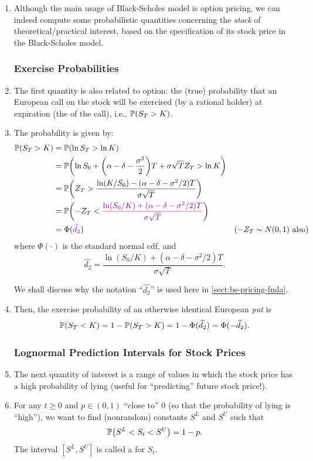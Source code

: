 \begin{enumerate}
\item Although the main usage of Black-Scholes model is option pricing, we can
indeed compute some probabilistic quantities concerning the \emph{stock}
 of theoretical/practical interest, based on the
specification of its stock price in the Black-Scholes model.
\subsubsection*{Exercise Probabilities}
\item The first quantity is also related to option: the (true) probability that
an European call on the stock  will be exercised (by a
rational holder) at expiration (the  of the call),
i.e.,
\(\mathbb{P}\qty(S_T>K)\).
\item \label{it:bs-exercise-prob-fmla}
The probability is given by:
\begin{align*}
\prob{S_T>K}&=\prob{\ln S_T>\ln K}\\
&=\prob{\ln S_0+\qty(\alpha-\delta-\frac{\sigma^2}{2})T+\sigma\sqrt{T}Z_T>\ln K}\\
&=\prob{Z_T>\frac{\ln(K/S_0)-(\alpha-\delta-\sigma^2/2)T}{\sigma\sqrt{T}}}\\
&=\prob{{\color{Maroon}-}Z_T<{\color{violet}\frac{\ln(S_0/K)+(\alpha-\delta-\sigma^2/2)T}{\sigma\sqrt{T}}}}\\
&=\Phi({\color{violet}\widehat{d_2}})&(-Z_T\sim N(0,1)\text{ also})
\end{align*}
where \(\Phi(\cdot)\) is the standard normal cdf, and 
\[
\text{\(\widehat{d_2}\)}=\frac{\ln(S_0/K)+(\alpha-\delta-\sigma^2/2)T}{\sigma\sqrt{T}}.
\]
\begin{note}
We shall discuss why the notation ``\(\widehat{d_2}\)'' is used here in
\cref{sect:bs-pricing-fmla}.
\end{note}
\item Then, the exercise probability of an otherwise identical European
\emph{put} is
\[
\mathbb{P}\qty(S_T<K)=1-\mathbb{P}\qty(S_T>K)=1-\Phi(\widehat{d_2})=\Phi(-\widehat{d_2}).
\]
\subsubsection*{Lognormal Prediction Intervals for Stock Prices}
\item The next quantity of interest is a range of values in which the stock
price has a high probability of lying (useful for ``predicting'' future stock
price!).
\item For any \(t\ge 0\) and \(p\in (0,1)\) ``close to'' 0 (so that the
probability of lying is ``high''), we want to find (nonrandom) constants
\(S^L\) and \(S^U\) such that
\[
\mathbb{P}\qty(S^L<S_t<S^U)=1-p.
\]
The interval \([S^L,S^U]\) is called a  for \(S_t\).


\end{enumerate}

